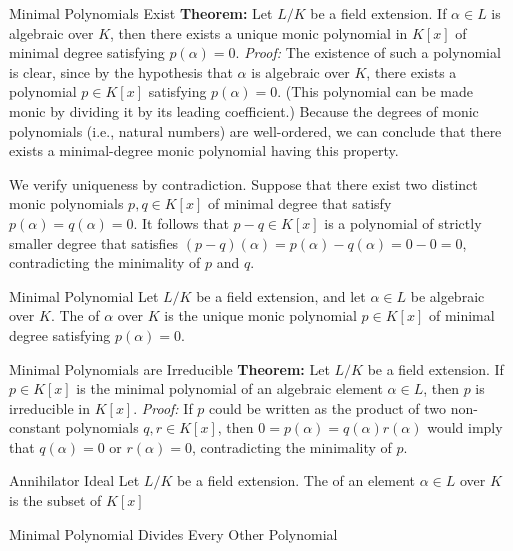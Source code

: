 \documentclass[12pt]{report}
\begin{document}
\begin{thmbox}{Minimal Polynomials Exist}
	\textbf{Theorem:} Let $L/K$ be a field extension. If $\alpha \in L$ is algebraic over $K$, then there exists a unique monic polynomial in $K[x]$ of minimal degree satisfying $p(\alpha) = 0$.
\tcblower
	\textit{Proof:} The existence of such a polynomial is clear, since by the hypothesis that $\alpha$ is algebraic over $K$, there exists a polynomial $p \in K[x]$ satisfying $p(\alpha) = 0$. (This polynomial can be made monic by dividing it by its leading coefficient.) Because the degrees of monic polynomials (i.e., natural numbers) are well-ordered, we can conclude that there exists a minimal-degree monic polynomial having this property.

	We verify uniqueness by contradiction. Suppose that there exist two distinct monic polynomials $p, q \in K[x]$ of minimal degree that satisfy $p(\alpha) = q(\alpha) = 0$. It follows that $p-q \in K[x]$ is a polynomial of strictly smaller degree that satisfies $(p-q)(\alpha) = p(\alpha) - q(\alpha) = 0 - 0 = 0$, contradicting the minimality of $p$ and $q$.
\end{thmbox}

\begin{dfnbox}{Minimal Polynomial}
	Let $L/K$ be a field extension, and let $\alpha \in L$ be algebraic over $K$. The  of $\alpha$ over $K$ is the unique monic polynomial $p \in K[x]$ of minimal degree satisfying $p(\alpha) = 0$.
\end{dfnbox}

\begin{thmbox}{Minimal Polynomials are Irreducible}
	\textbf{Theorem:} Let $L/K$ be a field extension. If $p \in K[x]$ is the minimal polynomial of an algebraic element $\alpha \in L$, then $p$ is irreducible in $K[x]$.
\tcblower
	\textit{Proof:} If $p$ could be written as the product of two non-constant polynomials $q, r \in K[x]$, then $0 = p(\alpha) = q(\alpha) r(\alpha)$ would imply that $q(\alpha) = 0$ or $r(\alpha) = 0$, contradicting the minimality of $p$.
\end{thmbox}

\begin{dfnbox}{Annihilator Ideal}
	Let $L/K$ be a field extension. The  of an element $\alpha \in L$ over $K$ is the subset of $K[x]$
\end{dfnbox}

\begin{thmbox}{Minimal Polynomial Divides Every Other Polynomial}
\end{thmbox}
\end{document}
